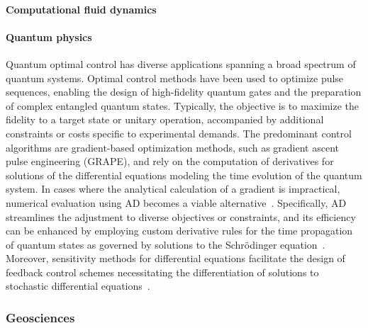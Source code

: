 \paragraph{Computational fluid dynamics}


\paragraph{Quantum physics}

Quantum optimal control has diverse applications spanning a broad spectrum of quantum systems. 
Optimal control methods have been used to optimize pulse sequences, enabling the design of high-fidelity quantum gates and the preparation of complex entangled quantum states. 
Typically, the objective is to maximize the fidelity to a target state or unitary operation, accompanied by additional constraints or costs specific to experimental demands. 
The predominant control algorithms are gradient-based optimization methods, such as gradient ascent pulse engineering (GRAPE), and rely on the computation of derivatives for solutions of the differential equations modeling the time evolution of the quantum system. 
In cases where the analytical calculation of a gradient is impractical, numerical evaluation using AD becomes a viable alternative~\cite{jirari:2009, leung:2017, abdelhafez:2019, jirari2019quantum, abdelhafez:2020, schaefer:2020, goerz:2022}. 
Specifically, AD streamlines the adjustment to diverse objectives or constraints, and its efficiency can be enhanced by employing custom derivative rules for the time propagation of quantum states as governed by solutions to the Schrödinger equation~\cite{goerz:2022}. 
Moreover, sensitivity methods for differential equations facilitate the design of feedback control schemes necessitating the differentiation of solutions to stochastic differential equations~\cite{schaefer:2021}.


\subsubsection{Geosciences}

